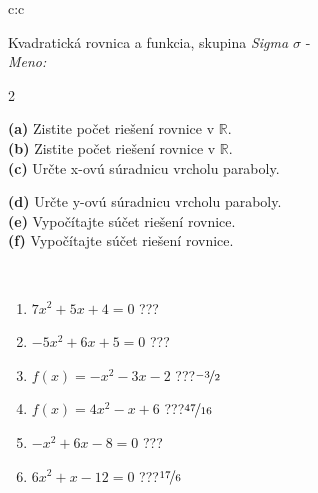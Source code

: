 \documentclass[10pt]{report}
\begin{document}
\begin{tabular}{c:c}
\begin{minipage}[c][104.5mm][t]{0.5\linewidth}
\begin{center}
\vspace{7mm}
{\huge {\LARGE Kvadratická rovnica a funkcia}, skupina \textit{Sigma $\sigma$} -}\\[5mm]
\textit{Meno:}\phantom{xxxxxxxxxxxxxxxxxxxxxxxxxxxxxxxxxxxxxxxxxxxxxxxxxxxxxxxxxxxxxxxxx}\\[5mm]
\begin{minipage}{0.95\linewidth}
\begin{center}
{\small \begin{multicols}{2} \raggedright
\textbf{(a)} Zistite počet riešení rovnice v \(\mathbb{R}\). \\[1mm]
\textbf{(b)} Zistite počet riešení rovnice v \(\mathbb{R}\). \\[1mm]
\textbf{(c)} Určte x-ovú súradnicu vrcholu paraboly. \par \columnbreak
\textbf{(d)} Určte y-ovú súradnicu vrcholu paraboly. \\[1mm]
\textbf{(e)} Vypočítajte súčet riešení rovnice. \\[1mm]
\textbf{(f)} Vypočítajte súčet riešení rovnice.
\end{multicols}
}
\end{center}
\end{minipage}
\\[4mm]
\begin{minipage}{0.79\linewidth}
\begin{center}
\begin{varwidth}{\linewidth}
\begin{enumerate}
\Large
\item $7x^2+5x+4=0$\quad \dotfill\; ???\;\dotfill {}
\item $-5x^2+6x+5=0$\quad \dotfill\; ???\;\dotfill {}
\item $f(x)=-x^2-3x-2$\quad \dotfill\; ???\;\dotfill \quad $\nicefrac{-3}{2}$
\item $f(x)=4x^2-x+6$\quad \dotfill\; ???\;\dotfill \quad $\nicefrac{47}{16}$
\item $-x^2+6x-8=0$\quad \dotfill\; ???\;\dotfill {}
\item $6x^2+x-12=0$\quad \dotfill\; ???\;\dotfill \quad $\nicefrac{17}{6}$
\end{enumerate}
\end{varwidth}
\end{center}

\end{minipage}
\end{center}
\end{minipage}
\end{tabular}
\end{document}
